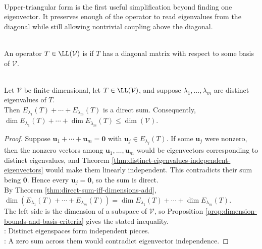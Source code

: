 \begin{perspective} \label{per:upper-triangular-viewpoint} \\
Upper-triangular form is the first useful simplification beyond finding one eigenvector. It preserves enough of the operator to read eigenvalues from the diagonal while still allowing nontrivial coupling above the diagonal.
\end{perspective}

\begin{definition} \label{def:diagonalizable-operator} \\
An operator $T\in\LL(\mathcal{V})$ is  if $T$ has a diagonal matrix with respect to some basis of $\mathcal{V}$.
\end{definition}

\begin{proposition} \label{prop:eigenspaces-for-distinct-eigenvalues-form-direct-sum} \\
Let $\mathcal{V}$ be finite-dimensional, let $T\in\LL(\mathcal{V})$, and suppose $\lambda_1,\ldots,\lambda_m$ are distinct eigenvalues of $T$.\\
Then $E_{\lambda_1}(T)+\cdots+E_{\lambda_m}(T)$ is a direct sum. Consequently, $\dim E_{\lambda_1}(T)+\cdots+\dim E_{\lambda_m}(T)\leq\dim(\mathcal{V})$.
\begin{proof}
Suppose $\mathbf{u}_1+\cdots+\mathbf{u}_m=\mathbf{0}$ with $\mathbf{u}_j\in E_{\lambda_j}(T)$. If some $\mathbf{u}_j$ were nonzero, then the nonzero vectors among $\mathbf{u}_1,\ldots,\mathbf{u}_m$ would be eigenvectors corresponding to distinct eigenvalues, and Theorem \ref{thm:distinct-eigenvalues-independent-eigenvectors} would make them linearly independent. This contradicts their sum being $\mathbf{0}$. Hence every $\mathbf{u}_j=\mathbf{0}$, so the sum is direct.\\
By Theorem \ref{thm:direct-sum-iff-dimensions-add}, $\dim(E_{\lambda_1}(T)+\cdots+E_{\lambda_m}(T))=\dim E_{\lambda_1}(T)+\cdots+\dim E_{\lambda_m}(T)$.\\
The left side is the dimension of a subspace of $\mathcal{V}$, so Proposition \ref{prop:dimension-bounds-and-basis-criteria} gives the stated inequality.\\
: Distinct eigenspaces form independent pieces.\\
: A zero sum across them would contradict eigenvector independence.
\end{proof}
\end{proposition}

